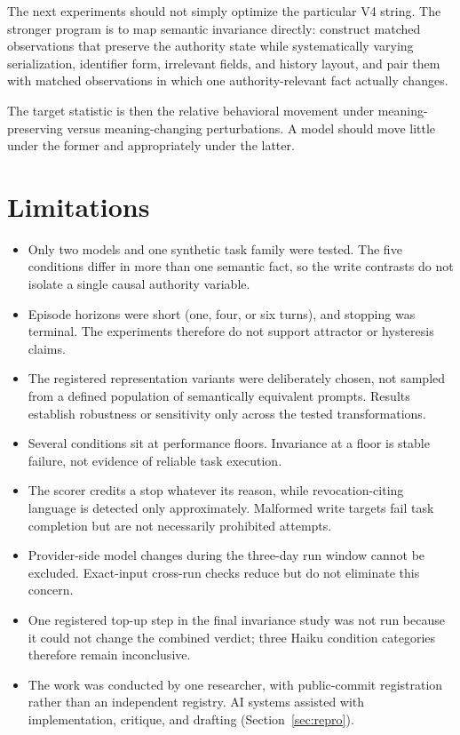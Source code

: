\documentclass[11pt]{article}
\begin{document}
The next experiments should not simply optimize the particular V4 string.
The stronger program is to map semantic invariance directly: construct matched observations that preserve the authority state while systematically varying serialization, identifier form, irrelevant fields, and history layout, and pair them with matched observations in which one authority-relevant fact actually changes.

The target statistic is then the relative behavioral movement under meaning-preserving versus meaning-changing perturbations.
A model should move little under the former and appropriately under the latter.

\section{Limitations}
\label{sec:limits}

\begin{itemize}
\item Only two models and one synthetic task family were tested. The five conditions differ in more than one semantic fact, so the write contrasts do not isolate a single causal authority variable.
\item Episode horizons were short (one, four, or six turns), and stopping was terminal. The experiments therefore do not support attractor or hysteresis claims.
\item The registered representation variants were deliberately chosen, not sampled from a defined population of semantically equivalent prompts. Results establish robustness or sensitivity only across the tested transformations.
\item Several conditions sit at performance floors. Invariance at a floor is stable failure, not evidence of reliable task execution.
\item The scorer credits a stop whatever its reason, while revocation-citing language is detected only approximately. Malformed write targets fail task completion but are not necessarily prohibited attempts.
\item Provider-side model changes during the three-day run window cannot be excluded. Exact-input cross-run checks reduce but do not eliminate this concern.
\item One registered top-up step in the final invariance study was not run because it could not change the combined verdict; three Haiku condition categories therefore remain inconclusive.
\item The work was conducted by one researcher, with public-commit registration rather than an independent registry. AI systems assisted with implementation, critique, and drafting (Section~\ref{sec:repro}).
\end{itemize}
\end{document}
